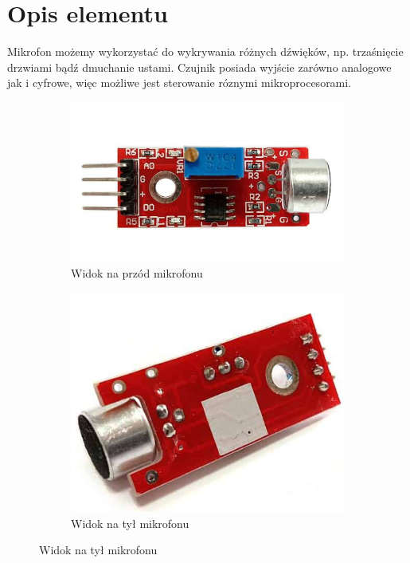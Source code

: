 \documentclass[11pt, a4paper]{article}
\author{Dawid Włodarczyk}
\begin{document}
%
%
\newpage

\section*{Opis elementu}
Mikrofon możemy wykorzystać do wykrywania różnych dźwięków, np. trzaśnięcie drzwiami bądź dmuchanie ustami. Czujnik posiada wyjście zarówno analogowe jak i cyfrowe, więc możliwe jest sterowanie róznymi mikroprocesorami. 
\vspace{0.25cm}
\begin{figure}[h]
\centering
\begin{subfigure}{.5\textwidth}
\centering
\includegraphics[width=.7\linewidth]{fig/KY-038/zasada_dzialania/front_mikro.png}
\caption{Widok na przód mikrofonu \cite{przod}}
\label{fig:_zdjecie_elementu}
\end{subfigure}%
\begin{subfigure}{.5\textwidth}
\centering
\includegraphics[width=.6\linewidth]{fig/KY-038/zasada_dzialania/tyl_mikro.png}
\caption{Widok na tył mikrofonu \cite{tyl}}
\label{fig:_zasada_dzialania_elementu}
\end{subfigure}
\label{fig:element}
\end{figure}
\vspace{0.25cm}
\end{document}
